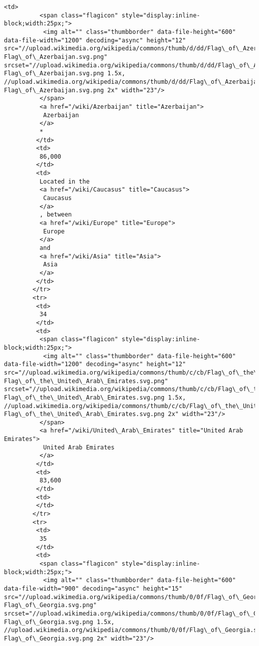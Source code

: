 \documentclass[11pt]{article}
\begin{document}
\begin{Verbatim}[commandchars=\\\{\}]
         <td>
          <span class="flagicon" style="display:inline-block;width:25px;">
           <img alt="" class="thumbborder" data-file-height="600" data-file-width="1200" decoding="async" height="12" src="//upload.wikimedia.org/wikipedia/commons/thumb/d/dd/Flag\_of\_Azerbaijan.svg/23px-Flag\_of\_Azerbaijan.svg.png" srcset="//upload.wikimedia.org/wikipedia/commons/thumb/d/dd/Flag\_of\_Azerbaijan.svg/35px-Flag\_of\_Azerbaijan.svg.png 1.5x, //upload.wikimedia.org/wikipedia/commons/thumb/d/dd/Flag\_of\_Azerbaijan.svg/46px-Flag\_of\_Azerbaijan.svg.png 2x" width="23"/>
          </span>
          <a href="/wiki/Azerbaijan" title="Azerbaijan">
           Azerbaijan
          </a>
          *
         </td>
         <td>
          86,000
         </td>
         <td>
          Located in the
          <a href="/wiki/Caucasus" title="Caucasus">
           Caucasus
          </a>
          , between
          <a href="/wiki/Europe" title="Europe">
           Europe
          </a>
          and
          <a href="/wiki/Asia" title="Asia">
           Asia
          </a>
         </td>
        </tr>
        <tr>
         <td>
          34
         </td>
         <td>
          <span class="flagicon" style="display:inline-block;width:25px;">
           <img alt="" class="thumbborder" data-file-height="600" data-file-width="1200" decoding="async" height="12" src="//upload.wikimedia.org/wikipedia/commons/thumb/c/cb/Flag\_of\_the\_United\_Arab\_Emirates.svg/23px-Flag\_of\_the\_United\_Arab\_Emirates.svg.png" srcset="//upload.wikimedia.org/wikipedia/commons/thumb/c/cb/Flag\_of\_the\_United\_Arab\_Emirates.svg/35px-Flag\_of\_the\_United\_Arab\_Emirates.svg.png 1.5x, //upload.wikimedia.org/wikipedia/commons/thumb/c/cb/Flag\_of\_the\_United\_Arab\_Emirates.svg/46px-Flag\_of\_the\_United\_Arab\_Emirates.svg.png 2x" width="23"/>
          </span>
          <a href="/wiki/United\_Arab\_Emirates" title="United Arab Emirates">
           United Arab Emirates
          </a>
         </td>
         <td>
          83,600
         </td>
         <td>
         </td>
        </tr>
        <tr>
         <td>
          35
         </td>
         <td>
          <span class="flagicon" style="display:inline-block;width:25px;">
           <img alt="" class="thumbborder" data-file-height="600" data-file-width="900" decoding="async" height="15" src="//upload.wikimedia.org/wikipedia/commons/thumb/0/0f/Flag\_of\_Georgia.svg/23px-Flag\_of\_Georgia.svg.png" srcset="//upload.wikimedia.org/wikipedia/commons/thumb/0/0f/Flag\_of\_Georgia.svg/35px-Flag\_of\_Georgia.svg.png 1.5x, //upload.wikimedia.org/wikipedia/commons/thumb/0/0f/Flag\_of\_Georgia.svg/45px-Flag\_of\_Georgia.svg.png 2x" width="23"/>

\end{Verbatim}
\end{document}
